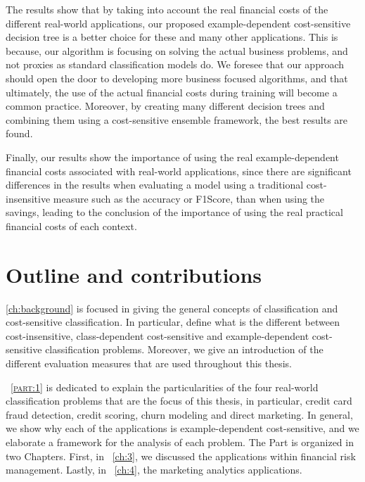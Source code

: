   The results show that by taking into account the real financial costs of the different 
  real-world applications, our  proposed example-dependent cost-sensitive decision tree is a better 
  choice for these and many other applications. This is because, our algorithm is focusing on 
  solving the actual business problems,  and not proxies as standard classification models do. We 
  foresee that our approach should open the door to developing more business focused algorithms, 
  and  that ultimately, the use of the actual financial costs during training will become a common 
  practice. Moreover, by creating many different decision trees and combining them using a 
  cost-sensitive ensemble framework, the best results are found.

  Finally, our results show the importance of using the real example-dependent financial costs 
  associated with real-world applications, since there are significant differences in the 
  results when evaluating a model using a traditional cost-insensitive measure such as the 
  accuracy or F1Score,  than when using the savings, leading to the conclusion of the 
  importance of using the real practical financial costs of each context.

\newpage
\section{Outline and contributions}


\chaptername{ \ref{ch:background}} is focused in giving the general concepts of classification 
and cost-sensitive classification. In particular, define what is the different between 
cost-insensitive, class-dependent cost-sensitive and example-dependent cost-sensitive 
classification problems. Moreover, we give an introduction of the different evaluation measures 
that are used throughout this thesis.

\partname{~\textsc{\ref{part:1}}} is dedicated to explain the particularities of the four 
real-world classification problems that are the focus of this thesis, in particular, credit card 
fraud detection, credit scoring, churn modeling and direct marketing. In general, we show why each 
of the applications is example-dependent cost-sensitive, and we elaborate a framework for the 
analysis of each problem. The Part is organized in two Chapters. First, in 
\chaptername{~\ref{ch:3}}, we discussed the applications within financial risk management. Lastly, 
in  \chaptername{~\ref{ch:4}}, the marketing analytics applications.

